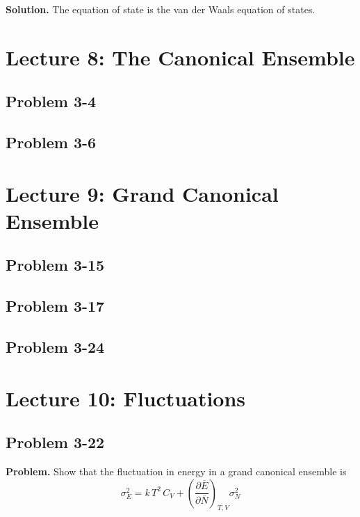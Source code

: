 \documentclass[twocolumn, 10pt]{article}
\numberwithin{equation}{section}
\newenvironment{problem}
{\par\medskip\sffamily \color{problue}
  \textbf{Problem. }\ignorespaces}
{\medskip}
\newenvironment{solution}
{\par\medskip
  \textbf{Solution. }\ignorespaces}
{\medskip}
\begin{document}
\begin{solution}
The equation of state is the van der Waals equation of states.
\end{solution}

\section{Lecture 8: The Canonical Ensemble}

\subsection{Problem 3-4}

\subsection{Problem 3-6}

\section{Lecture 9: Grand Canonical Ensemble}

\subsection{Problem 3-15}

\subsection{Problem 3-17}

\subsection{Problem 3-24}

\section{Lecture 10: Fluctuations}

\subsection{Problem 3-22}

\begin{problem}
Show that the fluctuation in energy in a grand canonical ensemble is
$$
\sigma_E^2 = k \, T^2 \, C_V
  + \left( \frac{\partial \overline E } { \partial \overline N} \right)_{T, V} \sigma_N^2
$$
\end{problem}
\end{document}
